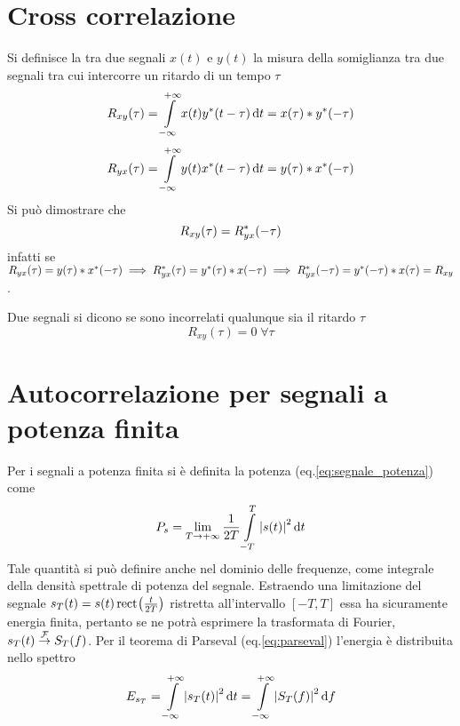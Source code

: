 \section{Cross correlazione}
Si definisce la  tra due segnali $x(t)$ e $y(t)$ la misura della somiglianza tra due segnali tra cui intercorre un ritardo di un tempo $\tau$
\begin{equation}R_{xy}(\tau)=\int\limits_{-\infty}^{+\infty}{x(t){y}^\ast(t-\tau)}{\,\mathop{}\!\mathrm{d}{t}}=x(\tau)\ast {y}^\ast(-\tau)\end{equation}
\begin{equation}R_{yx}(\tau)=\int\limits_{-\infty}^{+\infty}{y(t){x}^\ast(t-\tau)}{\,\mathop{}\!\mathrm{d}{t}}=y(\tau)\ast {x}^\ast(-\tau)\end{equation}
Si può dimostrare che \[R_{xy}(\tau)=R_{yx}^\ast(-\tau)\] infatti se $R_{yx}(\tau)=y(\tau)\ast {x}^\ast(-\tau)\implies R_{yx}^\ast(\tau)={y}^\ast(\tau)\ast x(-\tau)\implies
R_{yx}^\ast(-\tau)={y}^\ast(-\tau)\ast x(\tau)=R_{xy}$.

Due segnali si dicono  se sono incorrelati qualunque sia il ritardo $\tau$ \[R_{xy}(\tau)=0\;\forall\tau\]

\section{Autocorrelazione per segnali a potenza finita}
Per i segnali a potenza finita si è definita la potenza (eq.\ref{eq:segnale_potenza}) come \[P_s=\lim\limits_{T\to+\infty}{\frac{1}{2T}\int\limits_{-T}^{T}{\left|{s(t)}\right|^2}{\,\mathop{}\!\mathrm{d}{t}}}\]
Tale quantità si può definire anche nel dominio delle frequenze, come integrale della densità spettrale di potenza del segnale. Estraendo una limitazione del segnale $s_T(t)=s(t)\,{\operatorname{rect}}^{}\!\left({\frac{t}{2T}}\right)$ ristretta all'intervallo $[-T,T]$ essa ha sicuramente energia finita, pertanto se ne potrà esprimere la trasformata di Fourier, $s_T(t)\overset{\operatorname{\mathcal{F}}}{\to}S_T(f)$. Per il teorema di Parseval (eq.\ref{eq:parseval}) l'energia è distribuita nello spettro
\[E_{s_T}=\int\limits_{-\infty}^{+\infty}{\left|{s_T(t)}\right|^2}{\,\mathop{}\!\mathrm{d}{t}}=\int\limits_{-\infty}^{+\infty}{\left|{S_T(f)}\right|^2}{\,\mathop{}\!\mathrm{d}{f}}\]

